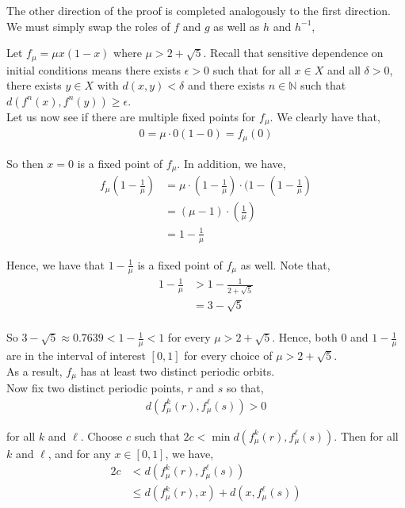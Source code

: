 \documentclass[12pt]{article}
\newenvironment{problem}[2][Problem]{\begin{trivlist}
\item[\hskip \labelsep {\bfseries #1}\hskip \labelsep {\bfseries #2.}]}{\end{trivlist}}
\begin{document}
The other direction of the proof is completed analogously to the first direction. We must simply swap the roles of $f$ and $g$ as well as $h$ and $h^{-1}$,

\newpage
\begin{problem}{3}
\end{problem}

Let $f_{\mu} = \mu x(1-x)$ where $\mu > 2 + \sqrt{5}$. Recall that sensitive dependence on initial conditions means there exists $\epsilon > 0$ such that for all $x \in X$ and all $\delta > 0$, there exists $y \in X$ with $d(x,y) < \delta$ and there exists $n \in \mathbb{N}$ such that $d(f^n(x), f^n(y)) \geq \epsilon$.\\

Let us now see if there are multiple fixed points for $f_{\mu}$. We clearly have that,
\begin{align*}
0 = \mu \cdot 0(1 - 0) = f_{\mu}(0)
\end{align*}

So then $x = 0$ is a fixed point of $f_{\mu}$. In addition, we have,
\begin{align*}
f_{\mu}(1 - \frac{1}{\mu}) &= \mu \cdot (1 - \frac{1}{\mu}) \cdot (1 - (1 - \frac{1}{\mu})\\
&= (\mu - 1) \cdot (\frac{1}{\mu})\\
&= 1 - \frac{1}{\mu}
\end{align*}

Hence, we have that $1 - \frac{1}{\mu}$ is a fixed point of $f_{\mu}$ as well. Note that,
\begin{align*}
1 - \frac{1}{\mu} &> 1 - \frac{1}{2 + \sqrt{5}}\\
&= 3 - \sqrt{5}\\
\end{align*}

So $3 - \sqrt{5} \approx 0.7639 < 1 - \frac{1}{\mu} < 1$ for every $\mu > 2 + \sqrt{5}$. Hence, both $0$ and $1 - \frac{1}{\mu}$ are in the interval of interest $[0, 1]$ for every choice of $\mu > 2 + \sqrt{5}$.\\

As a result, $f_{\mu}$ has at least two distinct periodic orbits.\\

Now fix two distinct periodic points, $r$ and $s$ so that,
\begin{align*}
d(f_{\mu}^k(r), f_{\mu}^{\ell}(s)) > 0
\end{align*}

for all $k$ and $\ell$. Choose $c$ such that $2c < \min d(f_{\mu}^k(r), f_{\mu}^{\ell}(s))$. Then for all $k$ and $\ell$, and for any $x \in [0, 1]$, we have,
\begin{align*}
2c &< d(f_{\mu}^k(r), f_{\mu}^{\ell}(s))\\
&\leq d(f_{\mu}^k(r), x) + d(x, f_{\mu}^{\ell}(s))
\end{align*}
\end{document}
